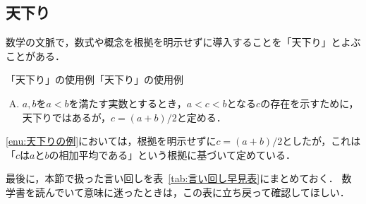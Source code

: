 \subsection{天下り}

数学の文脈で，数式や概念を根拠を明示せずに導入することを「天下り」とよぶことがある．

\begin{example}{「天下り」の使用例}{「天下り」の使用例}
  \begin{enumerate}[(A)]
    \item $a,b$を$a<b$を満たす実数とするとき，$ a < c < b$となる$c$の存在を示すために，
    天下りではあるが，$c=(a+b)/2$と定める\label{enu:天下りの例}．
  \end{enumerate}
\end{example}

\ref{enu:天下りの例}においては，根拠を明示せずに$c=(a+b)/2$としたが，これは「$c$は$a$と$b$の相加平均である」という根拠に基づいて定めている．

最後に，本節で扱った言い回しを表~\ref{tab:言い回し早見表}にまとめておく．
数学書を読んでいて意味に迷ったときは，この表に立ち戻って確認してほしい．

